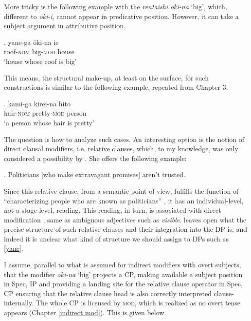 \documentclass [output=book,colorlinks,citecolor=brown]{langscibook}
\begin{document}
More tricky is the following example with the \textit{rentaishi} \textit{ōki-na} `big’, which, different to \textit{ōki-i}, cannot appear in predicative position. However, it can take a subject argument in attributive position.

\exg. yane-ga ōki-na ie\\
roof-\textsc{nom} big-\textsc{mod} house\\
`house whose roof is big’ \\ \null \hfill \label{yane}

This means, the structural make-up, at least on the surface, for such constructions is similar to the following example, repeated from Chapter 3.

\exg. kami-ga kirei-na hito\\
hair-\textsc{nom} pretty-\textsc{mod} person\\
`a person whose hair is pretty' \null \hfill \citep[34]{kaplan:1995:the}

The question is how to analyze such cases. An interesting option is the notion of direct clausal modifiers, i.e. relative clauses, which, to my knowledge, was only considered a possibility by \citet{kim:2019:syntax}. She offers the following example: %

\ex. Politicians [who make extravagant promises] aren’t trusted. \\ \null \hfill \citep[139]{kim:2019:syntax}

Since this relative clause, from a semantic point of view, fulfills the function of ``characterizing people who are known as politicians'' \citep[139]{kim:2019:syntax}, it has an individual-level, not a stage-level, reading. This reading, in turn, is associated with direct modification \citep{cinque:2010:adj}, same as ambiguous adjectives such as \textit{visible}. \citet{kim:2019:syntax} leaves open what the precise structure of such relative clauses and their integration into the DP is, and indeed it is unclear what kind of structure we should assign to DPs such as \ref{yane}.

I assume, parallel to what is assumed for indirect modifiers with overt subjects, that the modifier \textit{ōki-na} `big’ projects a CP, making available a subject position in Spec, IP and providing a landing site for the relative clause operator in Spec, CP ensuring that the relative clause head is also correctly interpreted clause-internally. The whole CP is licensed by \textsc{mod}, which is realized as no overt tense appears (Chapter \ref{indirect mod}). This is given below. %
\end{document}
